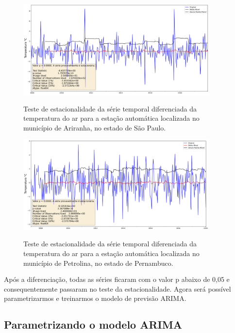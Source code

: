 \begin{figure}[H]
    \centering
    \caption{Teste de estacionalidade da série temporal diferenciada da temperatura do ar para a estação automática localizada no município de Ariranha, no estado de São Paulo.}
    \includegraphics[width=0.9\textwidth]{figuras/dickey_fuller_diff_A736.png}
    \label{fig:estacionalidade_seria_diferenciada_2}
\end{figure}

\begin{figure}[H]
    \centering
    \caption{Teste de estacionalidade da série temporal diferenciada da temperatura do ar para a estação automática localizada no município de Petrolina, no estado de Pernambuco.}
    \includegraphics[width=0.9\textwidth]{figuras/dickey_fuller_diff_712f3e11658051636f09732a60fb3c1b.png}
    \label{fig:estacionalidade_seria_diferenciada_3}
\end{figure}

Após a diferenciação, todas as séries ficaram com o valor p abaixo de 0,05 e consequentemente passaram no teste da estacionalidade. Agora será possível parametrizarmos e treinarmos o modelo de previsão ARIMA. 

\subsection{Parametrizando o modelo ARIMA}

